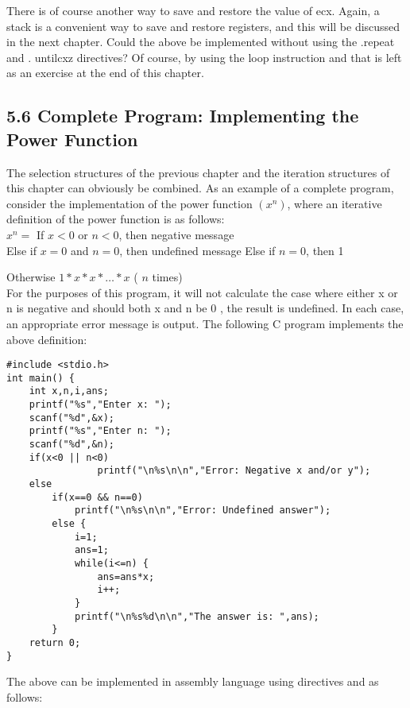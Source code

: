 \documentclass[10pt]{article}
\begin{document}
There is of course another way to save and restore the value of ecx. Again, a stack is a convenient way to save and restore registers, and this will be discussed in the next chapter. Could the above be implemented without using the .repeat and . untilcxz directives? Of course, by using the loop instruction and that is left as an exercise at the end of this chapter.

\subsection*{5.6 Complete Program: Implementing the Power Function}
The selection structures of the previous chapter and the iteration structures of this chapter can obviously be combined. As an example of a complete program, consider the implementation of the power function $\left(x^{n}\right)$, where an iterative definition of the power function is as follows:\\
$x^{n}=$ If $x<0$ or $n<0$, then negative message\\
Else if $x=0$ and $n=0$, then undefined message Else if $n=0$, then 1

Otherwise $1 * x * x * \ldots * x$ ( $n$ times)\\
For the purposes of this program, it will not calculate the case where either x or n is negative and should both x and n be 0 , the result is undefined. In each case, an appropriate error message is output. The following C program implements the above definition:

\begin{verbatim}
#include <stdio.h>
int main() {
    int x,n,i,ans;
    printf("%s","Enter x: ");
    scanf("%d",&x);
    printf("%s","Enter n: ");
    scanf("%d",&n);
    if(x<0 || n<0)
                printf("\n%s\n\n","Error: Negative x and/or y");
    else
        if(x==0 && n==0)
            printf("\n%s\n\n","Error: Undefined answer");
        else {
            i=1;
            ans=1;
            while(i<=n) {
                ans=ans*x;
                i++;
            }
            printf("\n%s%d\n\n","The answer is: ",ans);
        }
    return 0;
}
\end{verbatim}

The above can be implemented in assembly language using directives and as follows:
\end{document}
